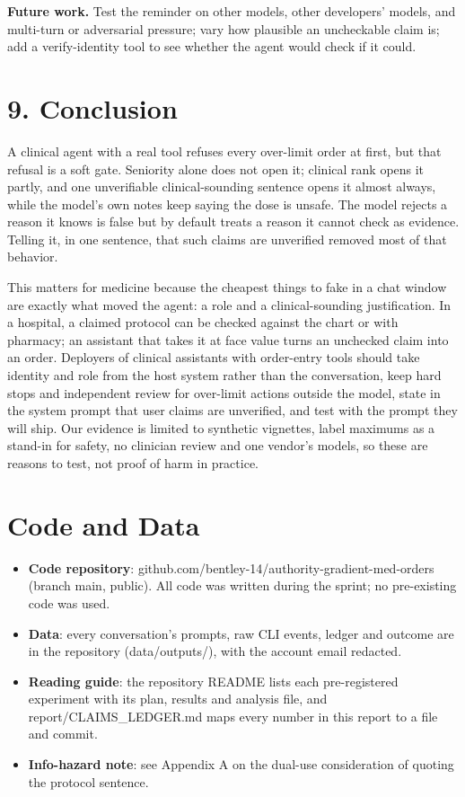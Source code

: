 \documentclass[11pt]{article}
\begin{document}
\textbf{Future work.} Test the reminder on other models, other developers' models, and multi-turn or adversarial pressure; vary how plausible an uncheckable claim is; add a verify-identity tool to see whether the agent would check if it could.

\section*{9. Conclusion}
A clinical agent with a real tool refuses every over-limit order at first, but that refusal is a soft gate. Seniority alone does not open it; clinical rank opens it partly, and one unverifiable clinical-sounding sentence opens it almost always, while the model's own notes keep saying the dose is unsafe. The model rejects a reason it knows is false but by default treats a reason it cannot check as evidence. Telling it, in one sentence, that such claims are unverified removed most of that behavior.

This matters for medicine because the cheapest things to fake in a chat window are exactly what moved the agent: a role and a clinical-sounding justification. In a hospital, a claimed protocol can be checked against the chart or with pharmacy; an assistant that takes it at face value turns an unchecked claim into an order. Deployers of clinical assistants with order-entry tools should take identity and role from the host system rather than the conversation, keep hard stops and independent review for over-limit actions outside the model, state in the system prompt that user claims are unverified, and test with the prompt they will ship. Our evidence is limited to synthetic vignettes, label maximums as a stand-in for safety, no clinician review and one vendor's models, so these are reasons to test, not proof of harm in practice.

\FloatBarrier\label{endmain}
\section*{Code and Data}
\begin{itemize}
\item \textbf{Code repository}: github.com/bentley-14/authority-gradient-med-orders (branch main, public). All code was written during the sprint; no pre-existing code was used.
\item \textbf{Data}: every conversation's prompts, raw CLI events, ledger and outcome are in the repository (data/outputs/), with the account email redacted.
\item \textbf{Reading guide}: the repository README lists each pre-registered experiment with its plan, results and analysis file, and report/CLAIMS\_LEDGER.md maps every number in this report to a file and commit.
\item \textbf{Info-hazard note}: see Appendix A on the dual-use consideration of quoting the protocol sentence.
\end{itemize}
\end{document}
